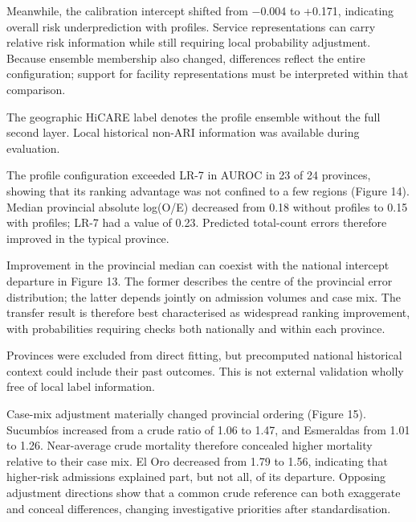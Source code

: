 \documentclass[11pt,a4paper]{article}
\newcommand{\subheading}[1]{\par\needspace{3\baselineskip}\vspace{5pt}{\bfseries #1}\par\vspace{1pt}}
\begin{document}
Meanwhile, the calibration intercept shifted from $-$0.004 to +0.171, indicating overall risk underprediction with profiles. Service representations can carry relative risk information while still requiring local probability adjustment. Because ensemble membership also changed, differences reflect the entire configuration; support for facility representations must be interpreted within that comparison.

{\small The geographic HiCARE label denotes the profile ensemble without the full second layer. Local historical non-ARI information was available during evaluation.\par}
\subheading{Figure 14. Provincial (A) AUROC and (B) observed-to-expected mortality when each province is excluded from direct model training.}
The profile configuration exceeded LR-7 in AUROC in 23 of 24 provinces, showing that its ranking advantage was not confined to a few regions (Figure 14). Median provincial absolute log(O/E) decreased from 0.18 without profiles to 0.15 with profiles; LR-7 had a value of 0.23. Predicted total-count errors therefore improved in the typical province.

Improvement in the provincial median can coexist with the national intercept departure in Figure 13. The former describes the centre of the provincial error distribution; the latter depends jointly on admission volumes and case mix. The transfer result is therefore best characterised as widespread ranking improvement, with probabilities requiring checks both nationally and within each province.

{\small Provinces were excluded from direct fitting, but precomputed national historical context could include their past outcomes. This is not external validation wholly free of local label information.\par}
\subheading{Figure 15. Provincial case-mix-standardised in-hospital mortality ratios, with empirical Bayes estimates and 95\% intervals; vertical tick marks indicate crude ratios.}
Case-mix adjustment materially changed provincial ordering (Figure 15). Sucumbíos increased from a crude ratio of 1.06 to 1.47, and Esmeraldas from 1.01 to 1.26. Near-average crude mortality therefore concealed higher mortality relative to their case mix. El Oro decreased from 1.79 to 1.56, indicating that higher-risk admissions explained part, but not all, of its departure. Opposing adjustment directions show that a common crude reference can both exaggerate and conceal differences, changing investigative priorities after standardisation.
\end{document}
